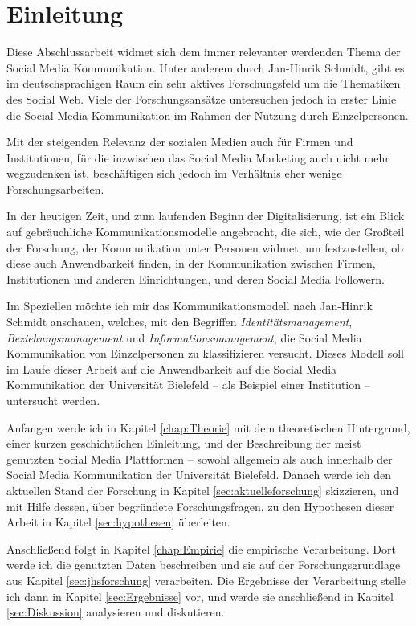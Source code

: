 \chapter{Einleitung}
\label{chap:Einleitung}


Diese Abschlussarbeit widmet sich dem immer relevanter werdenden Thema der Social Media Kommunikation. Unter anderem durch Jan-Hinrik Schmidt, gibt es im deutschsprachigen Raum ein sehr aktives Forschungsfeld um die Thematiken des Social Web. Viele der Forschungsansätze untersuchen jedoch in erster Linie die Social Media Kommunikation im Rahmen der Nutzung durch Einzelpersonen.

Mit der steigenden Relevanz der sozialen Medien auch für Firmen und Institutionen, für die inzwischen das Social Media Marketing auch nicht mehr wegzudenken ist, beschäftigen sich jedoch im Verhältnis eher wenige Forschungsarbeiten.

In der heutigen Zeit, und zum laufenden Beginn der Digitalisierung, ist ein Blick auf gebräuchliche Kommunikationsmodelle angebracht, die sich, wie der Großteil der Forschung, der Kommunikation unter Personen widmet, um festzustellen, ob diese auch Anwendbarkeit finden, in der Kommunikation zwischen Firmen, Institutionen und anderen Einrichtungen, und deren Social Media Followern.

Im Speziellen möchte ich mir das Kommunikationsmodell nach Jan-Hinrik Schmidt anschauen, welches, mit den Begriffen \textit{Identitätsmanagement}, \textit{Beziehungsmanagement} und \textit{Informationsmanagement}, die Social Media Kommunikation von Einzelpersonen zu klassifizieren versucht. Dieses Modell soll im Laufe dieser Arbeit auf die Anwendbarkeit auf die Social Media Kommunikation der Universität Bielefeld -- als Beispiel einer Institution -- untersucht werden. \smallskip

Anfangen werde ich in Kapitel \ref{chap:Theorie} mit dem theoretischen Hintergrund, einer kurzen geschichtlichen Einleitung, und der Beschreibung der meist genutzten Social Media Plattformen -- sowohl allgemein als auch innerhalb der Social Media Kommunikation der Universität Bielefeld. Danach werde ich den aktuellen Stand der Forschung in Kapitel \ref{sec:aktuelleforschung} skizzieren, und mit Hilfe dessen, über begründete Forschungsfragen, zu den Hypothesen dieser Arbeit in Kapitel \ref{sec:hypothesen} überleiten.

Anschließend folgt in Kapitel \ref{chap:Empirie} die empirische Verarbeitung. Dort werde ich die genutzten Daten beschreiben und sie auf der Forschungsgrundlage aus Kapitel \ref{sec:jhsforschung} verarbeiten. Die Ergebnisse der Verarbeitung stelle ich dann in Kapitel \ref{sec:Ergebnisse} vor, und werde sie anschließend in Kapitel \ref{sec:Diskussion} analysieren und diskutieren.

